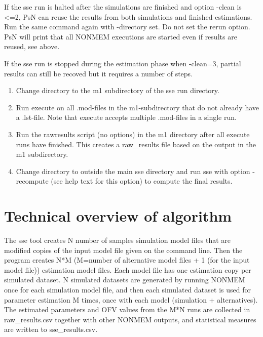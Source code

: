 If the sse run is halted after the simulations are finished and option -clean is <=2, PsN can reuse the results from both simulations and finished estimations. Run the same command again with -directory set. Do not set the rerun option. PsN will print that all NONMEM executions are started even if results are reused, see above. 

If the sse run is stopped during the estimation phase when -clean=3, partial results can still be recoved but it requires a number of steps.
\begin{enumerate}
\item Change directory to the m1 subdirectory of the sse run directory.
\item Run execute on all .mod-files in the m1-subdirectory that do not already have a .lst-file. Note that execute accepts multiple .mod-files in a single run.
\item Run the rawresults script (no options) in the m1 directory after all execute runs have finished.
This creates a raw\_results file based on the output in the m1 subdirectory.
\item Change directory to outside the main sse directory and run sse with option -recompute (see help text for this option) to compute the final results.
\end{enumerate}

\section{Technical overview of algorithm}
The sse tool creates N number of samples simulation model files that are modified copies of the input model file given on the command line. Then the program creates N*M (M=number of alternative model files + 1 (for the input model file)) estimation model files. Each model file has one estimation copy per simulated dataset. N simulated datasets are generated by running NONMEM once for each simulation model file, and then each simulated dataset is used for parameter estimation M times, once with each model (simulation + alternatives). The estimated parameters and OFV values from the M*N runs are collected in raw\_results.csv together with other NONMEM outputs, and statistical measures are written to sse\_results.csv. 

